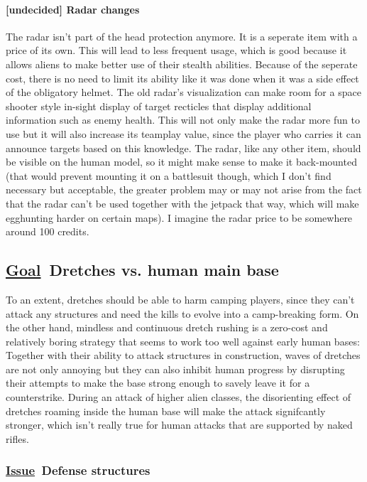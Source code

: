 \documentclass{scrartcl}
\newcommand{\goal}     [0]{\textbf{\underline{Goal}\ }}
\newcommand{\issue}    [0]{\textbf{\underline{Issue}\ }}
\newcommand{\undecided}[0]{\textcolor{undecided}{\textbf{[undecided] }}}
\begin{document}
\paragraph{\undecided Radar changes}

The radar isn't part of the head protection anymore. It is a seperate item with a price of its own. This will lead to less frequent usage, which is good because it allows aliens to make better use of their stealth abilities. Because of the seperate cost, there is no need to limit its ability like it was done when it was a side effect of the obligatory helmet. The old radar's visualization can make room for a space shooter style in-sight display of target recticles that display additional information such as enemy health. This will not only make the radar more fun to use but it will also increase its teamplay value, since the player who carries it can announce targets based on this knowledge. The radar, like any other item, should be visible on the human model, so it might make sense to make it back-mounted (that would prevent mounting it on a battlesuit though, which I don't find necessary but acceptable, the greater problem may or may not arise from the fact that the radar can't be used together with the jetpack that way, which will make egghunting harder on certain maps). I imagine the radar price to be somewhere around 100 credits.

\subsection{\goal Dretches vs. human main base}

To an extent, dretches should be able to harm camping players, since they can't attack any structures and need the kills to evolve into a camp-breaking form. On the other hand, mindless and continuous dretch rushing is a zero-cost and relatively boring strategy that seems to work too well against early human bases: Together with their ability to attack structures in construction, waves of dretches are not only annoying but they can also inhibit human progress by disrupting their attempts to make the base strong enough to savely leave it for a counterstrike. During an attack of higher alien classes, the disorienting effect of dretches roaming inside the human base will make the attack signifcantly stronger, which isn't really true for human attacks that are supported by naked rifles.

\subsubsection{\issue Defense structures}
\end{document}
